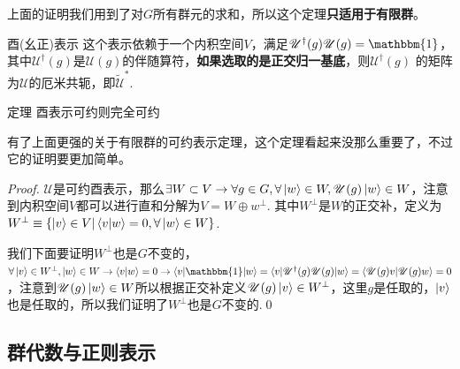 上面的证明我们用到了对$G$所有群元的求和，所以这个定理\textbf{只适用于有限群}。
\begin{define}{酉(幺正)表示}
    这个表示依赖于一个内积空间$V$，满足$\mathscr{U}^\dagger(g)\mathscr{U}(g)=\mathbbm{1}$，其中$\mathscr{U}^\dagger(g)$是$\mathscr{U}(g)$的伴随算符，\textbf{如果选取的是正交归一基底}，则$\mathscr{U}^\dagger(g)$
    的矩阵为$\mathcal{U}$的厄米共轭，即$\tilde{\mathcal{U}}^{*}$.
\end{define}
\begin{theorem}{定理}
    酉表示可约则完全可约
\end{theorem}
有了上面更强的关于有限群的可约表示定理，这个定理看起来没那么重要了，不过它的证明要更加简单。
\begin{proof}
    $\mathscr{U}$是可约酉表示，那么$\exists W\subset V\rightarrow \forall g\in G,\forall\ket{w}\in W,\mathscr{U}(g)\ket{w}\in W$，注意到内积空间$V$都可以进行直和分解为$V=W\oplus w^{\perp}$.
    其中$W^{\perp}$是$W$的正交补，定义为$W^{\perp}\equiv \{\ket{v}\in V|\braket{v|w}=0,\forall \ket{w}\in W\}$. 

    我们下面要证明$W^{\perp}$也是$G$不变的，$\forall \ket{v}\in W^{\perp},\ket{w}\in W\rightarrow \braket{v|w}=0\rightarrow\braket{v|\mathbbm{1}|w}=\braket{v|\mathscr{U}^\dagger(g)\mathscr{U}(g)|w}=\braket{\mathscr{U}(g)v|\mathscr{U}(g)w}=0$
    ，注意到$\mathscr{U}(g)\ket{w}\in W$所以根据正交补定义$\mathscr{U}(g)\ket{v}\in W^{\perp}$，这里$g$是任取的，$\ket{v}$也是任取的，所以我们证明了$W^{\perp}$也是$G$不变的.\qed
\end{proof}
\subsection{群代数与正则表示}


